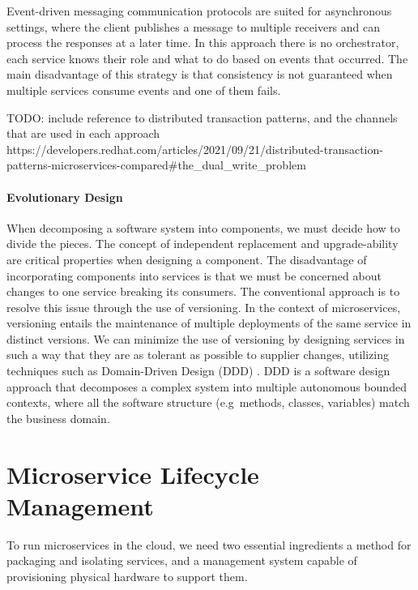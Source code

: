 Event-driven messaging communication protocols are suited for asynchronous settings,
where the client publishes a message to multiple receivers and can process the responses at a later time.
In this approach there is no orchestrator, each service knows their role and what to do based on events that occurred.
The main disadvantage of this strategy is that consistency is not guaranteed when multiple services consume events and one of them fails.

TODO: include reference to distributed transaction patterns, and the channels that are used in each approach https://developers.redhat.com/articles/2021/09/21/distributed-transaction-patterns-microservices-compared#the_dual_write_problem

\paragraph{Evolutionary Design}
When decomposing a software system into components, we must decide how to divide the pieces.
The concept of independent replacement and upgrade-ability are critical properties when designing a component.
The disadvantage of incorporating components into services is that we must be concerned about changes to one service breaking its consumers.
The conventional approach is to resolve this issue through the use of versioning.
In the context of microservices, versioning entails the maintenance of multiple deployments of the same service in distinct versions.
We can minimize the use of versioning by designing services in such a way that they are as tolerant as possible to supplier changes,
utilizing techniques such as Domain-Driven Design (DDD) \cite{ddd}.
DDD is a software design approach that decomposes a complex system into multiple autonomous bounded contexts,
where all the software structure (e.g\ methods, classes, variables) match the business domain.

\section{Microservice Lifecycle Management} %
\label{sec:microservice_lifecycle_management}

To run microservices in the cloud, we need two essential ingredients a method for packaging and isolating services,
and a management system capable of provisioning physical hardware to support them.

\paragraph{}

